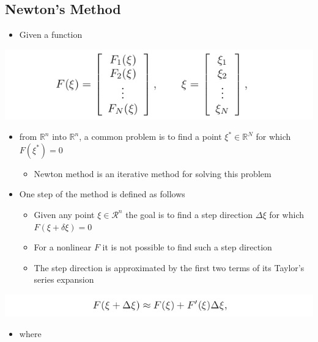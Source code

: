 \documentclass[11pt]{article}
\begin{document}
\subsection{Newton's Method}
\label{sec:orgc8c6bc9}
\begin{itemize}
\item Given a function
\end{itemize}
\begin{center}
\includegraphics[width=.9\linewidth]{A Path-Following Method/screenshot_2019-03-11_16-29-55.png}
\end{center}
\begin{itemize}
\item from \(\mathbb R^n\) into \(\mathbb R^n\), a common problem is to find a point \(\xi^* \in \mathbb R^N\) for which \(F(\xi^*) = 0\)
\begin{itemize}
\item Newton method is an iterative method for solving this problem
\end{itemize}

\item One step of the method is defined as follows
\begin{itemize}
\item Given any point \(\xi \in \mathcal R^n\) the goal is to find a step direction \(\Delta \xi\) for which \(F(\xi + \delta \xi) = 0\)
\item For a nonlinear \(F\) it is not possible to find such a step direction
\item The step direction is approximated by the first two terms of its Taylor's series expansion
\end{itemize}
\end{itemize}
\begin{center}
\includegraphics[width=.9\linewidth]{A Path-Following Method/screenshot_2019-03-11_16-34-52.png}
\end{center}
\begin{itemize}
\item where
\end{itemize}
\end{document}
